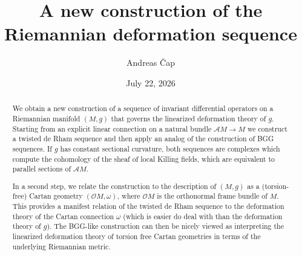 \documentclass[12pt,a4paper]{amsart}
\def\Cal{\mathcal}
\newcommand{\om}{\omega}
\numberwithin{theorem}{section}
\numberwithin{equation}{section}
\theoremstyle{definition}
\theoremstyle{remark}
\begin{document}
\renewcommand{\today}{} 

\title{A new construction of the\\ Riemannian deformation sequence }

\author{Andreas \v Cap}

\address{Faculty of Mathematics\\
  University of Vienna\\
  Oskar--Morgenstern--Platz 1\\
  1090 Wien\\
  Austria} 


\date{July 22, 2026}



\begin{abstract}
  We obtain a new construction of a sequence of invariant differential operators on a
  Riemannian manifold $(M,g)$ that governs the linearized deformation theory of
  $g$. Starting from an explicit linear connection on a natural bundle $\Cal AM\to M$
  we construct a twisted de Rham sequence and then apply an analog of the
  construction of BGG sequences. If $g$ has constant sectional curvature, both
  sequences are complexes which compute the cohomology of the sheaf of local Killing
  fields, which are equivalent to parallel sections of $\Cal AM$.

  In a second step, we relate the construction to the description of $(M,g)$ as a
  (torsion-free) Cartan geometry $(\Cal OM,\om)$, where $\Cal OM$ is the orthonormal
  frame bundle of $M$. This provides a manifest relation of the twisted de Rham
  sequence to the deformation theory of the Cartan connection $\om$ (which is easier
  do deal with than the deformation theory of $g$). The BGG-like construction can
  then be nicely viewed as interpreting the linearized deformation theory of torsion
  free Cartan geometries in terms of the underlying Riemannian metric.
\end{abstract}

\maketitle

\pagestyle{myheadings}
\end{document}
